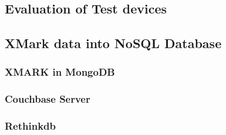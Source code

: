 \documentclass[a4paper,12pt]{article}
\begin{document}
		\subsection{Evaluation of Test devices}
		\subsection{XMark data into NoSQL Database}
			\label{xmark-nosql}
			
			\newpage			
			\subsubsection{XMARK in MongoDB}
			\label{xmark-mongodb}
			
			\subsubsection{Couchbase Server}
			\label{xmark-couchbase}
			
			\subsubsection{Rethinkdb}
			\label{xmark-rethinkdb}
			
        \newpage		
\end{document}
